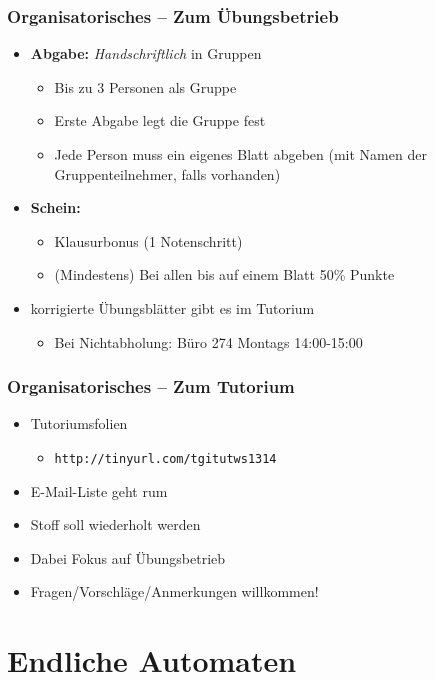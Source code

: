 \begin{frame}
	\frametitle{Organisatorisches -- Zum Übungsbetrieb}
	\begin{itemize}
		\item \textbf{Abgabe:} \emph{Handschriftlich} in Gruppen
		\begin{itemize}
			\item Bis zu 3 Personen als Gruppe
			\item Erste Abgabe legt die Gruppe fest
			\item Jede Person muss ein eigenes Blatt abgeben (mit Namen der Gruppenteilnehmer, falls vorhanden)
		\end{itemize}
		\item \textbf{Schein:} 
		\begin{itemize}
			\item Klausurbonus (1 Notenschritt)
			\item (Mindestens) Bei allen bis auf einem Blatt 50\% Punkte
		\end{itemize}
		\item korrigierte Übungsblätter gibt es im Tutorium
		\begin{itemize}
			\item Bei Nichtabholung: Büro 274 Montags 14:00-15:00
		\end{itemize}
	\end{itemize}
\end{frame}
\begin{frame}
	\frametitle{Organisatorisches -- Zum Tutorium}
	\begin{itemize}
	\item Tutoriumsfolien
		\begin{itemize}
			\item \texttt{http://tinyurl.com/tgitutws1314}
		\end{itemize}
		\item E-Mail-Liste geht rum
		\item Stoff soll wiederholt werden
		\item Dabei Fokus auf Übungsbetrieb
		\item Fragen/Vorschläge/Anmerkungen willkommen!
	\end{itemize}
\end{frame}

\section{Endliche Automaten}
